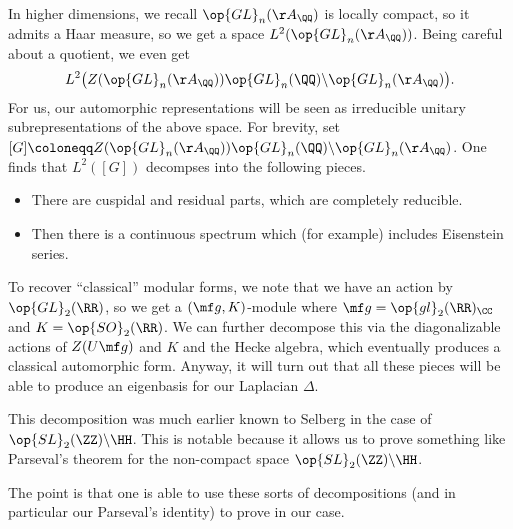 \documentclass{article}
\begin{document}
In higher dimensions, we recall $\op{GL}_n(\AA_\QQ)$ is locally compact, so it admits a Haar measure, so we get a space $L^2(\op{GL}_n(\AA_\QQ))$. Being careful about a quotient, we even get
\[L^2\big(Z(\op{GL}_n(\AA_\QQ))\op{GL}_n(\QQ)\backslash\op{GL}_n(\AA_\QQ)\big).\]
For us, our automorphic representations will be seen as irreducible unitary subrepresentations of the above space. For brevity, set $[G]\coloneqq Z(\op{GL}_n(\AA_\QQ))\op{GL}_n(\QQ)\backslash\op{GL}_n(\AA_\QQ)$. One finds that $L^2([G])$ decompses into the following pieces.
\begin{itemize}
	\item There are cuspidal and residual parts, which are completely reducible.
	\item Then there is a continuous spectrum which (for example) includes Eisenstein series.
\end{itemize}
To recover ``classical'' modular forms, we note that we have an action by $\op{GL}_2(\RR)$, so we get a $(\mf g,K)$-module where $\mf g=\op{gl}_2(\RR)_\CC$ and $K=\op{SO}_2(\RR)$. We can further decompose this via the diagonalizable actions of $Z(U\mf g)$ and $K$ and the Hecke algebra, which eventually produces a classical automorphic form. Anyway, it will turn out that all these pieces will be able to produce an eigenbasis for our Laplacian $\Delta$.
\begin{remark}
	This decomposition was much earlier known to Selberg in the case of $\op{SL}_2(\ZZ)\backslash\HH$. This is notable because it allows us to prove something like Parseval's theorem for the non-compact space $\op{SL}_2(\ZZ)\backslash\HH$.
\end{remark}
The point is that one is able to use these sorts of decompositions (and in particular our Parseval's identity) to prove  in our case.
\end{document}
